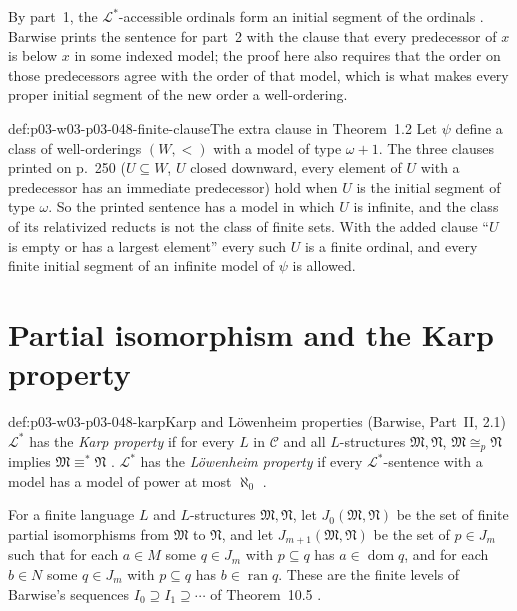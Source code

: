 By part~1, the \(\mathcal L^{\ast}\)-accessible ordinals form an initial
segment of the ordinals \cite[p.~251]{Barwise1974Axioms}.  Barwise prints
the sentence for part~2 with the clause that every predecessor of \(x\) is
below \(x\) in some indexed model; the proof here also requires that the
order on those predecessors agree with the order of that model, which is
what makes every proper initial segment of the new order a well-ordering.

\begin{hbwarning}{def:p03-w03-p03-048-finite-clause}{The extra clause in Theorem~1.2}
Let \(\psi\) define a class of well-orderings \((W,<)\) with a model of type
\(\omega+1\).  The three clauses printed on p.~250 (\(U\subseteq W\), \(U\)
closed downward, every element of \(U\) with a predecessor has an immediate
predecessor) hold when \(U\) is the initial segment of type \(\omega\).  So
the printed sentence has a model in which \(U\) is infinite, and the class of
its relativized reducts is not the class of finite sets.  With the added
clause ``\(U\) is empty or has a largest element'' every such \(U\) is a
finite ordinal, and every finite initial segment of an infinite model of
\(\psi\) is allowed.
\end{hbwarning}

\section{Partial isomorphism and the Karp property}
\label{sec:p03-w03-p03-048-karp}

\begin{hbdefinition}{def:p03-w03-p03-048-karp}{Karp and L\"owenheim properties (Barwise, Part~II, 2.1)}
\(\mathcal L^{\ast}\) has the \emph{Karp property} if for every \(L\) in
\(\mathcal C\) and all \(L\)-structures \(\mathfrak M,\mathfrak N\),
\(\mathfrak M\cong_{p}\mathfrak N\) implies
\(\mathfrak M\equiv^{\ast}\mathfrak N\) \cite[Part~II, \S2, 2.1,
p.~254]{Barwise1974Axioms}.  \(\mathcal L^{\ast}\) has the
\emph{L\"owenheim property} if every \(\mathcal L^{\ast}\)-sentence with a
model has a model of power at most \(\aleph_0\) \cite[p.~255]{Barwise1974Axioms}.
\end{hbdefinition}

For a finite language \(L\) and \(L\)-structures \(\mathfrak M,\mathfrak N\),
let \(J_0(\mathfrak M,\mathfrak N)\) be the set of finite partial
isomorphisms from \(\mathfrak M\) to \(\mathfrak N\), and let
\(J_{m+1}(\mathfrak M,\mathfrak N)\) be the set of \(p\in J_m\) such that for
each \(a\in M\) some \(q\in J_m\) with \(p\subseteq q\) has
\(a\in\operatorname{dom}q\), and for each \(b\in N\) some \(q\in J_m\) with
\(p\subseteq q\) has \(b\in\operatorname{ran}q\).  These are the finite
levels of Barwise's sequences \(I_0\supseteq I_1\supseteq\cdots\) of
Theorem~10.5 \cite[p.~245]{Barwise1974Axioms}.

